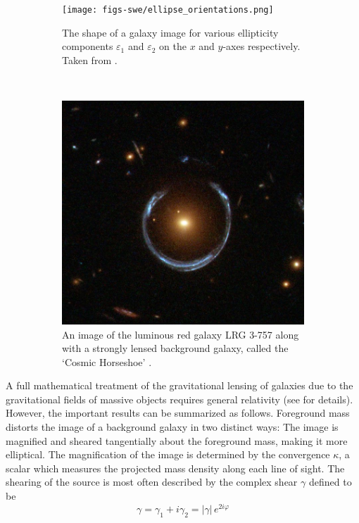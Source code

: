 \documentclass[%
 reprint,
 amsmath,amssymb,
 aps,nofootinbib
]{revtex4-1}
\begin{document}
\begin{figure}
    \centering
    \begin{subfigure}[H]{0.415\textwidth}
        \texttt{[image: figs-swe/ellipse\_orientations.png]}
        \captionsetup{justification=raggedright,singlelinecheck=false}
        \caption{The shape of a galaxy image for various ellipticity components $\varepsilon_1$ and $\varepsilon_2$ on the $x$ and $y$-axes respectively. Taken from \cite{schneider}.}
        \label{ellipses}
    \end{subfigure}
    ~
    \begin{subfigure}[H]{0.425\textwidth}
        \includegraphics[width=\textwidth]{figs-swe/einstein_ring.png}
        \captionsetup{justification=raggedright,singlelinecheck=false}
        \caption{An image of the luminous red galaxy LRG 3-757 along with a strongly lensed background galaxy, called the `Cosmic Horseshoe' \cite{einstein_ring}.}
        \label{einstein_ring}
    \end{subfigure}
    \caption{}
\end{figure}

A full mathematical treatment of the gravitational lensing of galaxies due to the gravitational fields of massive objects requires general relativity (see \cite{modern_cosmology} for details). However, the important results can be summarized as follows. Foreground mass distorts the image of a background galaxy in two distinct ways: The image is magnified and sheared tangentially about the foreground mass, making it more elliptical. The magnification of the image is determined by the convergence $\kappa$, a scalar which measures the projected mass density along each line of sight. The shearing of the source is most often described by the complex shear $\gamma$ defined to be
\begin{equation}\label{complex_shear}
\gamma=\gamma_1+i\gamma_2=|\gamma|\,e^{2i\varphi}
\end{equation}
\end{document}
